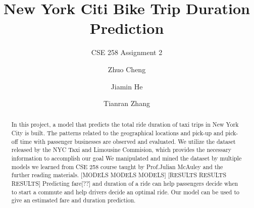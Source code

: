 \documentclass[sigconf]{acmart}
\begin{document}
\title{New York Citi Bike Trip Duration Prediction}
\subtitle{CSE 258 Assignment 2}



\author{Zhuo Cheng}

\author{Jiamin He}

\author{Tianran Zhang}




\begin{abstract}
  In this project, a model that predicts the total ride duration of taxi trips in New York City is built. The patterns related to the geographical locations and pick-up and pick-off time with passenger businesses are observed and evaluated. We utilize the dataset released by the NYC Taxi and Limousine Commision, which provides the necessary information to accomplish our goal
  We manipulated and mined the dataset by multiple models we learned from CSE 258 course taught by Prof.Julian McAuley and the further reading materials. [MODELS MODELS MODELS] [RESULTS RESULTS RESULTS] Predicting fare[??] and duration of a ride can help passengers decide when to start a commute and help drivers decide an optimal ride. Our model can be used to give an estimated fare and duration prediction.


\end{abstract}




\maketitle




 
\end{document}
